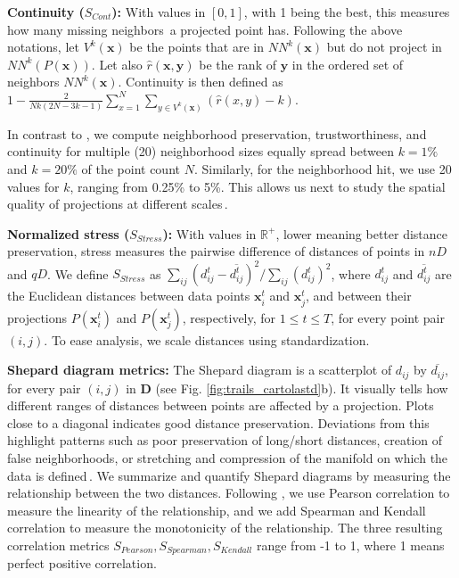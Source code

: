 \noindent
\textbf{Continuity ($S_{Cont}$):} With values in $[0,1]$, with 1 being the best, this measures how many missing neighbors\,\citep{Martins2014} a projected point has. Following the above notations, let $V^k(\mathbf{x})$
be the points that are in $NN^k(\mathbf{x})$ but do not project in $NN^k(P(\mathbf{x}))$. Let also $\hat{r}(\mathbf{x}, \mathbf{y})$ be the rank of $\mathbf{y}$ in the ordered set of neighbors $NN^k(\mathbf{x})$. Continuity is then defined as \linebreak
$1-\frac{2}{N k(2 N-3 k-1)} \sum_{x=1}^{N} \sum_{y \in V^k(\mathbf{x})}(\hat{r}(x, y)-k)$.

In contrast to \cite{Espadoto19}, we compute neighborhood preservation, trustworthiness, and continuity for multiple (20) neighborhood sizes equally spread between $k=1\%$ and $k=20\%$ of the point count $N$. Similarly, for the neighborhood hit, we use 20 values for $k$, ranging from 0.25\% to 5\%. This allows us next to study the spatial quality of projections at different scales\,\citep{Martins2015}.

\noindent
\textbf{Normalized stress ($S_{Stress}$):} With values in $\mathbb{R}^{+}$, lower meaning better distance preservation, stress measures the pairwise difference of distances of points in $nD$ and $qD$. We define $S_{Stress}$ as  $\sum_{i j}\left(d_{i j}^t - \overline{d_{i j}^t}\right)^{2} / \sum_{i j} (d_{i j}^t)^{2}$,
where $d_{i j}^t$ and $\overline{d_{i j}^t}$ are the Euclidean distances between data points $\mathbf{x}_i^t$ and $\mathbf{x}_j^t$, and between their projections $P(\mathbf{x}_i^t)$ and $P(\mathbf{x}_j^t)$, respectively, for $1 \leq t \leq T$, for every point pair $(i,j)$. To ease analysis, we scale distances using standardization.

\noindent
\textbf{Shepard diagram metrics:} The Shepard diagram is a scatterplot of $d_{ij}$ by $\overline{d_{ij}}$, for every pair $(i,j)$ in $\mathbf{D}$ (see Fig. \ref{fig:trails_cartolastd}b). It visually tells how different ranges of distances between points are affected by a projection. Plots close to a diagonal indicates good distance preservation.
Deviations from this highlight patterns such as poor preservation of long/short distances, creation of false neighborhoods, or stretching and compression of the manifold on which the data is defined\,\citep{Joia2011}. We summarize and quantify Shepard diagrams by measuring the relationship between the two distances. Following \cite{Espadoto19}, we use Pearson correlation to measure the linearity of the relationship, and we add Spearman and Kendall correlation to measure the monotonicity of the relationship. The three resulting correlation metrics $S_{Pearson}, S_{Spearman}, S_{Kendall}$ range from -1 to 1, where 1 means perfect positive correlation.

